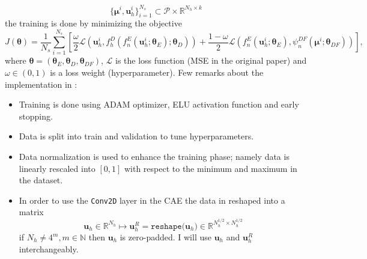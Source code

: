 \documentclass[11pt]{article}
\begin{document}
$$\{\boldsymbol \mu^i, \mathbf u_h^i\}_{i=1}^{N_s} \subset \mathcal P \times \mathbb R^{N_h \times k}$$
the training is done by minimizing the objective
$$J(\boldsymbol \theta)=\frac{1}{N_s}\sum_{i=1}^{N_s}\left[\frac{\omega}{2}\mathcal L(\mathbf u_h^i, f^D_h(f^E_n(\mathbf u_h^i; \boldsymbol \theta_E); \boldsymbol \theta_D))+\frac{1-\omega}{2}\mathcal L(f^E_n(\mathbf u_h^i; \boldsymbol \theta_E), \psi_n^{DF}(\boldsymbol \mu^i; \boldsymbol \theta_{DF}))\right],$$
where $\boldsymbol \theta=(\boldsymbol \theta_E, \boldsymbol \theta_D, \boldsymbol \theta_{DF})$, $\mathcal L$ is the loss function (MSE in the original paper) and $\omega \in (0, 1)$ is a loss weight (hyperparameter). Few remarks about the implementation in \cite{fresca2021comprehensive}:
\begin{itemize}
    \item Training is done using ADAM optimizer, ELU activation function and early stopping.
    \item Data is split into train and validation to tune hyperparameters.
    \item Data normalization is used to enhance the training phase; namely data is linearly rescaled into $[0, 1]$ with respect to the minimum and maximum in the dataset.
    \item In order to use the \texttt{Conv2D} layer in the CAE the data in reshaped into a matrix
    \begin{equation}
        \mathbf u_h \in \mathbb R^{N_h} \mapsto \mathbf u_h^R = \texttt{reshape($\mathbf u_h$)} \in \mathbb R^{N_h^{1/2} \times N_h^{1/2}}
    \label{eq:reshape}
    \end{equation}
    if $N_h \neq 4^m, m \in \mathbb N$ then $\mathbf u_h$ is zero-padded. I will use $\mathbf u_h$ and $\mathbf u_h^R$ interchangeably.
\end{itemize}
\end{document}
